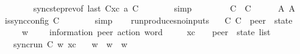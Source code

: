 \begin{isabellebody}
\ \ \ \ \ \ \isamarkupfalse%
\ sync{\isacharunderscore}{\kern0pt}step{\isacharunderscore}{\kern0pt}rev{\isacharparenleft}{\kern0pt}{}{\isacharparenright}{\kern0pt}{\isacharbrackleft}{\kern0pt}of\ {\isachardoublequoteopen}last\ {\isacharparenleft}{\kern0pt}C{}{\isacharhash}{\kern0pt}xc{\isacharparenright}{\kern0pt}{\isachardoublequoteclose}\ a\ C{\isacharbrackright}{\kern0pt}\isanewline
\ \ \ \ \ \ \isamarkupfalse%
\ simp\isanewline
\ \ \isamarkupfalse%
\isanewline
\ \ \ \ \isamarkupfalse%
\ {\isachardoublequoteopen}C\ {\isasymnoteq}\ C{\isacharprime}{\kern0pt}{\isachardoublequoteclose}\isanewline
\ \ \ \ \isamarkupfalse%
\ A{}\ A{}\ \isamarkupfalse%
\ {\isachardoublequoteopen}is{\isacharunderscore}{\kern0pt}sync{\isacharunderscore}{\kern0pt}config\ C{\isacharprime}{\kern0pt}{\isachardoublequoteclose}\isanewline
\ \ \ \ \ \ \isamarkupfalse%
\ simp\isanewline
\ \ \isamarkupfalse%
\isanewline
{}\isamarkupfalse%
%
\endisatagproof
{\isafoldproof}%
%
\isadelimproof
\isanewline
%
\endisadelimproof
\isanewline
{}\isamarkupfalse%
\ run{\isacharunderscore}{\kern0pt}produces{\isacharunderscore}{\kern0pt}no{\isacharunderscore}{\kern0pt}inputs{\isacharcolon}{\kern0pt}\isanewline
\ \ \ C\ C{\isacharprime}{\kern0pt}\ {\isacharcolon}{\kern0pt}{\isacharcolon}{\kern0pt}\ {\isachardoublequoteopen}{\isacharprime}{\kern0pt}peer\ {\isasymRightarrow}\ {\isacharprime}{\kern0pt}state{\isachardoublequoteclose}\isanewline
\ \ \ \ \ w\ \ \ \ {\isacharcolon}{\kern0pt}{\isacharcolon}{\kern0pt}\ {\isachardoublequoteopen}{\isacharparenleft}{\kern0pt}{\isacharprime}{\kern0pt}information{\isacharcomma}{\kern0pt}\ {\isacharprime}{\kern0pt}peer{\isacharparenright}{\kern0pt}\ action\ word{\isachardoublequoteclose}\isanewline
\ \ \ \ \ xc\ \ \ {\isacharcolon}{\kern0pt}{\isacharcolon}{\kern0pt}\ {\isachardoublequoteopen}{\isacharparenleft}{\kern0pt}{\isacharprime}{\kern0pt}peer\ {\isasymRightarrow}\ {\isacharprime}{\kern0pt}state{\isacharparenright}{\kern0pt}\ list{\isachardoublequoteclose}\isanewline
\ \ \ {\isachardoublequoteopen}sync{\isacharunderscore}{\kern0pt}run\ C\ w\ xc{\isachardoublequoteclose}\isanewline
\ \ \ {\isachardoublequoteopen}w{\isasymdown}\isactrlsub {\isacharbang}{\kern0pt}\ {\isacharequal}{\kern0pt}\ w{\isachardoublequoteclose}\ \ {\isachardoublequoteopen}w{\isasymdown}\isactrlsub {\isacharquery}{\kern0pt}\ {\isacharequal}{\kern0pt}\ {\isasymepsilon}{\isachardoublequoteclose}\isanewline

\end{isabellebody}
